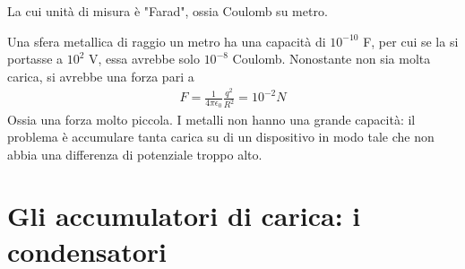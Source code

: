 \documentclass[a4paper, oneside]{article}
\begin{document}
La cui unità di misura è "Farad", ossia Coulomb su metro.
\begin{example}
    Una sfera metallica di raggio un metro ha una 
capacità di $10^{-10}$ F, per cui se la si portasse a $10^{2}$ V, essa avrebbe solo $10^{-8}$ Coulomb. Nonostante
non sia molta carica, si avrebbe una forza pari a
\begin{gather*}
    F = \frac{1}{4\pi\epsilon_0} \frac{q^{2}}{R^{2}} = 10^{-2} N
\end{gather*}
Ossia una forza molto piccola. I metalli non hanno una grande capacità: il problema è accumulare tanta 
carica su di un dispositivo in modo tale che non abbia una differenza di potenziale troppo alto.
\end{example} 

\section{Gli accumulatori di carica: i condensatori}
\end{document}
